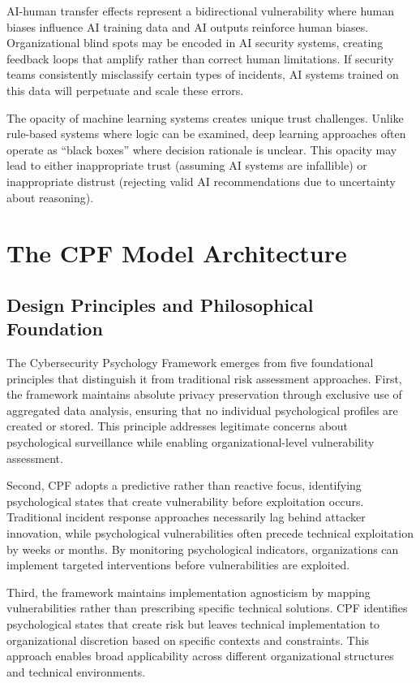 \documentclass[11pt,a4paper]{article}
\begin{document}
AI-human transfer effects represent a bidirectional vulnerability where human biases influence AI training data and AI outputs reinforce human biases. Organizational blind spots may be encoded in AI security systems, creating feedback loops that amplify rather than correct human limitations. If security teams consistently misclassify certain types of incidents, AI systems trained on this data will perpetuate and scale these errors.

The opacity of machine learning systems creates unique trust challenges. Unlike rule-based systems where logic can be examined, deep learning approaches often operate as ``black boxes'' where decision rationale is unclear. This opacity may lead to either inappropriate trust (assuming AI systems are infallible) or inappropriate distrust (rejecting valid AI recommendations due to uncertainty about reasoning).

\section{The CPF Model Architecture}

\subsection{Design Principles and Philosophical Foundation}

The Cybersecurity Psychology Framework emerges from five foundational principles that distinguish it from traditional risk assessment approaches. First, the framework maintains absolute privacy preservation through exclusive use of aggregated data analysis, ensuring that no individual psychological profiles are created or stored. This principle addresses legitimate concerns about psychological surveillance while enabling organizational-level vulnerability assessment.

Second, CPF adopts a predictive rather than reactive focus, identifying psychological states that create vulnerability before exploitation occurs. Traditional incident response approaches necessarily lag behind attacker innovation, while psychological vulnerabilities often precede technical exploitation by weeks or months. By monitoring psychological indicators, organizations can implement targeted interventions before vulnerabilities are exploited.

Third, the framework maintains implementation agnosticism by mapping vulnerabilities rather than prescribing specific technical solutions. CPF identifies psychological states that create risk but leaves technical implementation to organizational discretion based on specific contexts and constraints. This approach enables broad applicability across different organizational structures and technical environments.
\end{document}
